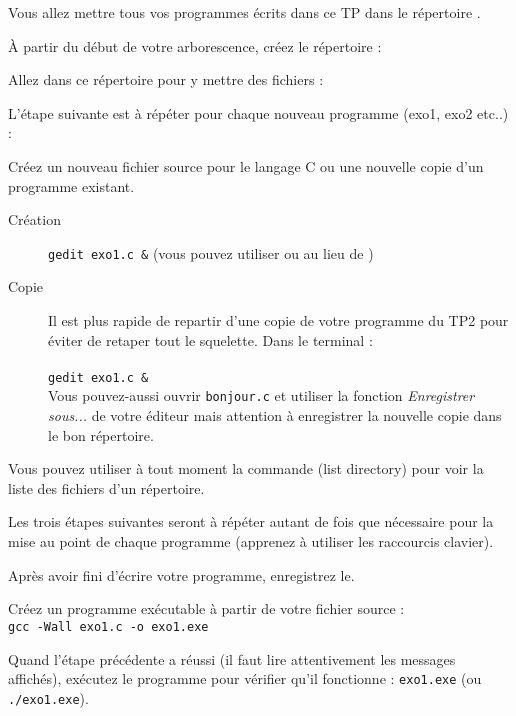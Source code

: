
Vous allez mettre tous vos programmes écrits dans ce TP dans le
répertoire \TPshortName. 

\begin{newenu}
\item À partir du début de votre arborescence, créez le répertoire
\TPshortName :  
\item Allez dans ce répertoire pour y mettre des fichiers : 
\end{newenu}

L'étape suivante est à répéter pour chaque nouveau programme (exo1, exo2 etc..) :
\begin{lastenu}
\item Créez un nouveau fichier source pour le langage C ou une nouvelle copie d'un programme existant.
  \begin{description}
  \item[Création]   \verb|gedit exo1.c &| (vous pouvez utiliser
     ou  au lieu de )
\item[Copie] Il est plus rapide de repartir d'une copie de votre programme  du TP2 pour éviter de retaper tout le squelette. Dans le terminal : \\  \\ \verb|gedit exo1.c &|\\ Vous pouvez-aussi ouvrir \verb+bonjour.c+ et utiliser la fonction \emph{Enregistrer sous...} de votre éditeur mais attention à enregistrer la nouvelle copie dans le bon répertoire. 
\end{description}
\end{lastenu}

Vous pouvez utiliser à tout moment la commande  (list directory)
pour voir la liste des fichiers d'un répertoire. 


Les trois étapes suivantes seront à répéter autant de fois que nécessaire pour la mise au point de chaque programme (apprenez à utiliser les raccourcis clavier). 
\begin{lastenu}
\item Après avoir fini d'écrire votre programme, enregistrez le.
\item Créez un programme exécutable à partir de votre fichier source :\\
  \verb|gcc -Wall exo1.c -o exo1.exe|
\item Quand l'étape précédente a réussi (il faut lire attentivement les
  messages affichés), exécutez le programme pour
  vérifier qu'il fonctionne : \verb|exo1.exe| (ou
  \verb|./exo1.exe|).
\end{lastenu}
